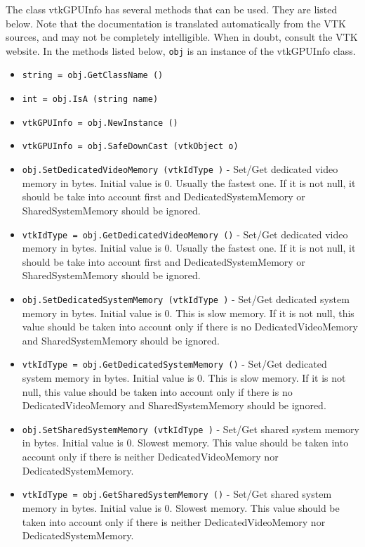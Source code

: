 The class vtkGPUInfo has several methods that can be used.
  They are listed below.
Note that the documentation is translated automatically from the VTK sources,
and may not be completely intelligible.  When in doubt, consult the VTK website.
In the methods listed below, \verb|obj| is an instance of the vtkGPUInfo class.
\begin{itemize}
\item  \verb|string = obj.GetClassName ()|

\item  \verb|int = obj.IsA (string name)|

\item  \verb|vtkGPUInfo = obj.NewInstance ()|

\item  \verb|vtkGPUInfo = obj.SafeDownCast (vtkObject o)|

\item  \verb|obj.SetDedicatedVideoMemory (vtkIdType )| -  Set/Get dedicated video memory in bytes. Initial value is 0.
 Usually the fastest one. If it is not null, it should be take into
 account first and DedicatedSystemMemory or SharedSystemMemory should be
 ignored.

\item  \verb|vtkIdType = obj.GetDedicatedVideoMemory ()| -  Set/Get dedicated video memory in bytes. Initial value is 0.
 Usually the fastest one. If it is not null, it should be take into
 account first and DedicatedSystemMemory or SharedSystemMemory should be
 ignored.

\item  \verb|obj.SetDedicatedSystemMemory (vtkIdType )| -  Set/Get dedicated system memory in bytes. Initial value is 0.
 This is slow memory. If it is not null, this value should be taken into
 account only if there is no DedicatedVideoMemory and SharedSystemMemory
 should be ignored.

\item  \verb|vtkIdType = obj.GetDedicatedSystemMemory ()| -  Set/Get dedicated system memory in bytes. Initial value is 0.
 This is slow memory. If it is not null, this value should be taken into
 account only if there is no DedicatedVideoMemory and SharedSystemMemory
 should be ignored.

\item  \verb|obj.SetSharedSystemMemory (vtkIdType )| -  Set/Get shared system memory in bytes. Initial value is 0.
 Slowest memory. This value should be taken into account only if there is
 neither DedicatedVideoMemory nor DedicatedSystemMemory.

\item  \verb|vtkIdType = obj.GetSharedSystemMemory ()| -  Set/Get shared system memory in bytes. Initial value is 0.
 Slowest memory. This value should be taken into account only if there is
 neither DedicatedVideoMemory nor DedicatedSystemMemory.

\end{itemize}
